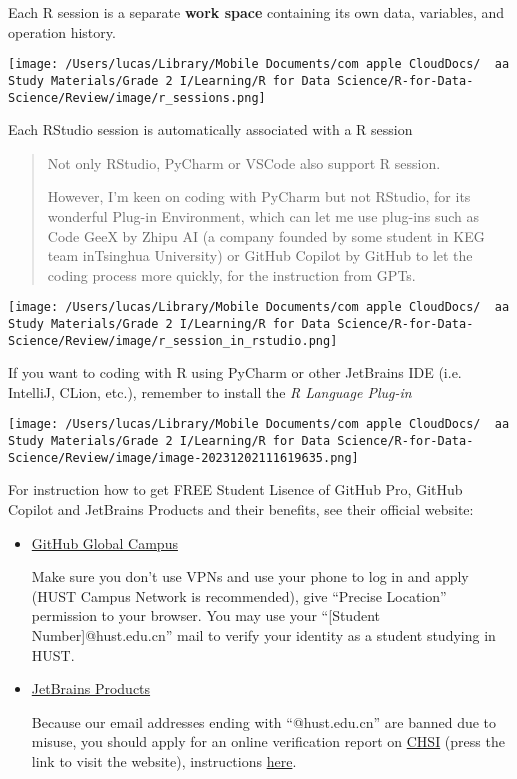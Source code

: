 \documentclass[
]{article}
\begin{document}
Each R session is a separate \textbf{work space} containing its own
data, variables, and operation history.

\texttt{[image: /Users/lucas/Library/Mobile Documents/com~apple~CloudDocs/~~aa Study Materials/Grade 2 I/Learning/R for Data Science/R-for-Data-Science/Review/image/r\_sessions.png]}

Each RStudio session is automatically associated with a R session

\begin{quote}
Not only RStudio, PyCharm or VSCode also support R session.

However, I'm keen on coding with PyCharm but not RStudio, for its
wonderful Plug-in Environment, which can let me use plug-ins such as
Code GeeX by Zhipu AI (a company founded by some student in KEG team
inTsinghua University) or GitHub Copilot by GitHub to let the coding
process more quickly, for the instruction from GPTs.
\end{quote}

\texttt{[image: /Users/lucas/Library/Mobile Documents/com~apple~CloudDocs/~~aa Study Materials/Grade 2 I/Learning/R for Data Science/R-for-Data-Science/Review/image/r\_session\_in\_rstudio.png]}

If you want to coding with R using PyCharm or other JetBrains IDE (i.e.
IntelliJ, CLion, etc.), remember to install the \emph{R Language
Plug-in}

\texttt{[image: /Users/lucas/Library/Mobile Documents/com~apple~CloudDocs/~~aa Study Materials/Grade 2 I/Learning/R for Data Science/R-for-Data-Science/Review/image/image-20231202111619635.png]}

For instruction how to get FREE Student Lisence of GitHub Pro, GitHub
Copilot and JetBrains Products and their benefits, see their official
website:

\begin{itemize}
\item
  \href{https://campus.github.com}{GitHub Global Campus}

  Make sure you don't use VPNs and use your phone to log in and apply
  (HUST Campus Network is recommended), give ``Precise Location''
  permission to your browser. You may use your ``{[}Student
  Number{]}@hust.edu.cn'' mail to verify your identity as a student
  studying in HUST.
\item
  \href{https://www.jetbrains.com/lp/leaflets-gdc/students/}{JetBrains
  Products}

  Because our email addresses ending with ``@hust.edu.cn'' are banned
  due to misuse, you should apply for an online verification report on
  \href{chsi.com.cn}{CHSI} (press the link to visit the website),
  instructions \href{https://www.chsi.com.cn/xlcx/rhsq.jsp}{here}.
\end{itemize}
\end{document}
